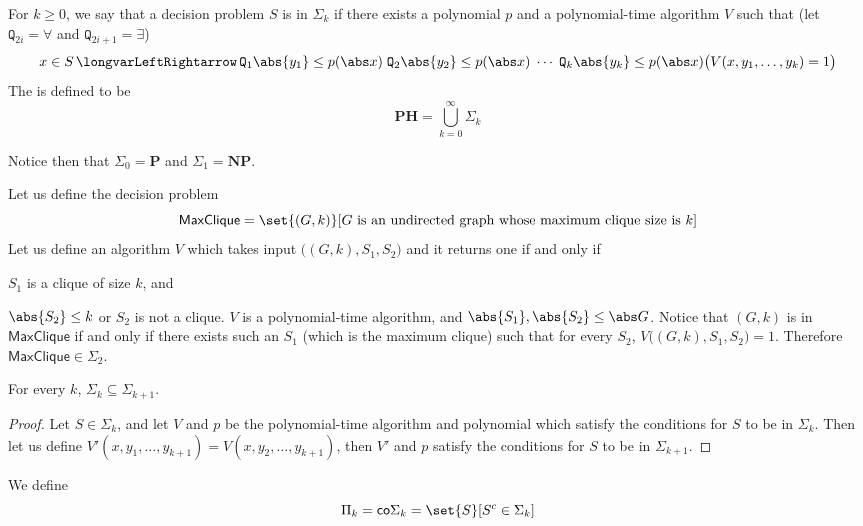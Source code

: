 \documentclass[10pt]{article}
\def\iff{\,\longvarLeftRightarrow\,}
\def\quant{\mathtt{Q}}
\def\maxclique{\mathsf{MaxClique}}
\def\PH{\mathbf{PH}}
\def\P{\mathbf{P}}
\def\NP{\mathbf{NP}}
\begin{document}
\begin{defn*}

    For $k\geq0$, we say that a decision problem $S$ is in $\Sigma_k$ if there exists a polynomial $p$ and a polynomial-time algorithm $V$ such that (let $\quant_{2i}=\forall$ and $\quant_{2i+1}=\exists$)
    \[ x\in S\iff \quant_1\abs{y_1}\leq p(\abs x)\;\quant_2\abs{y_2}\leq p(\abs x)\;\cdots\;\quant_k\abs{y_k}\leq p(\abs x)\bigl(V(x,y_1,\dots,y_k)=1\bigr) \]
    The  is defined to be
    \[ \PH = \bigcup_{k=0}^\infty \Sigma_k \]

\end{defn*}

Notice then that $\Sigma_0=\P$ and $\Sigma_1=\NP$.

\begin{exam*}

    Let us define the decision problem
    \[ \maxclique = \set{(G,k)}[\text{$G$ is an undirected graph whose maximum clique size is $k$}] \]
    Let us define an algorithm $V$ which takes input $\bigl((G,k),S_1,S_2\bigr)$ and it returns one if and only if
    \benum
        \item $S_1$ is a clique of size $k$, and
        \item $\abs{S_2}\leq k$ or $S_2$ is not a clique.
    \eenum
    $V$ is a polynomial-time algorithm, and $\abs{S_1},\abs{S_2}\leq\abs G$.
    Notice that $(G,k)$ is in $\maxclique$ if and only if there exists such an $S_1$ (which is the maximum clique) such that for every $S_2$, $V\bigl((G,k),S_1,S_2\bigr)=1$.
    Therefore $\maxclique\in\Sigma_2$.

\end{exam*}

\begin{prop*}

    For every $k$, $\Sigma_k\subseteq\Sigma_{k+1}$.

\end{prop*}

\begin{proof}

    Let $S\in\Sigma_k$, and let $V$ and $p$ be the polynomial-time algorithm and polynomial which satisfy the conditions for $S$ to be in $\Sigma_k$.
    Then let us define $V'(x,y_1,\dots,y_{k+1})=V(x,y_2,\dots,y_{k+1})$, then $V'$ and $p$ satisfy the conditions for $S$ to be in $\Sigma_{k+1}$.

\end{proof}

\begin{defn*}

    We define
    \[ \Pi_k = \mathsf{co}\Sigma_k = \set{S}[S^c\in\Sigma_k] \]

\end{defn*}
\end{document}
